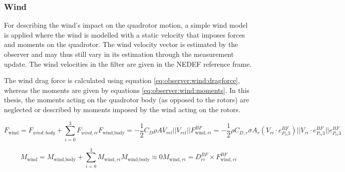 \subsubsection{Wind}
    For describing the wind's impact on the quadrotor motion,
    a simple wind model is applied where the wind is modelled with
    a static velocity that imposes forces and moments on the quadrotor.
    The wind velocity vector is estimated by the observer and may thus still vary
    in its estimation through the measurement update.
    The wind velocities in the filter are given in the NEDEF reference frame.

    The wind drag force is calculated using equation \eqref{eq:observer:wind:dragforce},
    whereas the moments are given by equations \eqref{eq:observer:wind:moments}.
    In this thesis, the moments acting on the quadrotor body (as opposed to the rotors)
    are neglected or described by moments imposed by the wind acting on the rotors.

    \begin{subequations}
    \label{eq:observer:wind:dragforce}
        \begin{equation}
            F_{\text{wind}} = F_{wind,body} + \sum_{i=0}^{3} F_{wind,ri}
        \end{equation}
        \begin{equation}
            F_{\text{wind,body}} = -\frac{1}{2} C_{D} \rho A V_{rel} ||V_{rel}||
        \end{equation}
        \begin{equation}
            F^{BF}_{\text{wind},ri} = -\frac{1}{2} \rho C_{D,r} \sigma A_{r} (V_{ri} \cdot e_{P_{ri}3}^{BF}) ||V_{ri} \cdot e_{P_{ri}3}^{BF}|| e_{P_{ri}3}^{BF}
        \end{equation}
    \end{subequations}

    \begin{subequations}
    \label{eq:observer:wind:moments}
        \begin{equation}
            M_{\text{wind}} = M_{\text{wind,body}} + \sum_{i=0}^{3}M_{\text{wind},ri}
        \end{equation}
        \begin{equation}
            M_{\text{wind,body}} \approx 0 %
        \end{equation}
        \begin{equation}
            M_{\text{wind},ri} = D_{ri}^{BF} \times F^{BF}_{\text{wind},ri}
        \end{equation}
    \end{subequations}


